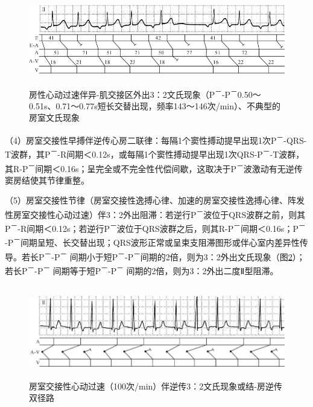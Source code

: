 \begin{figure}[!htbp]
 \centering
 \includegraphics[width=5.6875in,height=1.52083in]{./images/Image00601.jpg}
 \captionsetup{justification=centering}
 \caption{房性心动过速伴异-肌交接区外出3：2文氏现象（P\textsuperscript{－}-P\textsuperscript{－}0.50～0.51s、0.71～0.77s短长交替出现，频率143～146次/min）、不典型的房室文氏现象}
 \label{fig37-7}
  \end{figure} 


（4）房室交接性早搏伴逆传心房二联律：每隔1个窦性搏动提早出现1次P\textsuperscript{－}-QRS-T波群，其P\textsuperscript{－}-R间期＜0.12s，或每隔1个窦性搏动提早出现1次QRS-P\textsuperscript{－}-T波群，其R-P\textsuperscript{－}间期＜0.16s；呈完全或不完全性代偿间歇，这取决于P\textsuperscript{－}波激动有无逆传窦房结使其节律重整。

（5）房室交接性节律（房室交接性逸搏心律、加速的房室交接性逸搏心律、阵发性房室交接性心动过速）伴3：2外出阻滞：若逆行P\textsuperscript{－}波位于QRS波群之前，则其P\textsuperscript{－}-R间期＜0.12s；若逆行P\textsuperscript{－}波位于QRS波群之后，则其R-P\textsuperscript{－}间期＜0.16s；P\textsuperscript{－} -P\textsuperscript{－}间期呈短、长交替出现；QRS波形正常或呈束支阻滞图形或伴心室内差异性传导。若长P\textsuperscript{－}-P\textsuperscript{－} 间期小于短P\textsuperscript{－}-P\textsuperscript{－}间期的2倍，则为3：2外出文氏现象（图\ref{fig37-8}）；若长P\textsuperscript{－}-P\textsuperscript{－} 间期等于短P\textsuperscript{－}-P\textsuperscript{－} 间期的2倍，则为3：2外出二度Ⅱ型阻滞。

\begin{figure}[!htbp]
 \centering
 \includegraphics[width=5.84375in,height=1.59375in]{./images/Image00602.jpg}
 \captionsetup{justification=centering}
 \caption{房室交接性心动过速（100次/min）伴逆传3：2文氏现象或结-房逆传双径路}
 \label{fig37-8}
  \end{figure} 

